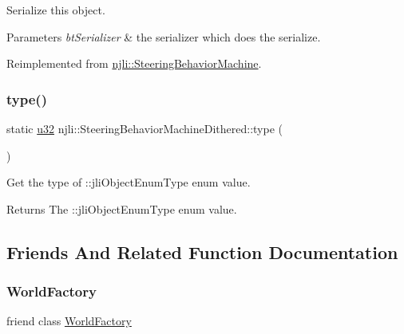 Serialize this object.


\begin{DoxyParams}{Parameters}
{\em bt\+Serializer} & the serializer which does the serialize. \\
\hline
\end{DoxyParams}


Reimplemented from \mbox{\hyperlink{classnjli_1_1_steering_behavior_machine_a1fbec43b76f0612ed5b0d2492bb4b6df}{njli\+::\+Steering\+Behavior\+Machine}}.

\mbox{\label{classnjli_1_1_steering_behavior_machine_dithered_a010e9f5b4f86832a6bcfedc724720582}} 
\subsubsection{\texorpdfstring{type()}{type()}}
{\footnotesize\ttfamily static \mbox{\hyperlink{_util_8h_a10e94b422ef0c20dcdec20d31a1f5049}{u32}} njli\+::\+Steering\+Behavior\+Machine\+Dithered\+::type (\begin{DoxyParamCaption}{ }\end{DoxyParamCaption})\hspace{0.3cm}{\ttfamily [static]}}

Get the type of \+::jli\+Object\+Enum\+Type enum value.

\begin{DoxyReturn}{Returns}
The \+::jli\+Object\+Enum\+Type enum value. 
\end{DoxyReturn}


\subsection{Friends And Related Function Documentation}
\mbox{\label{classnjli_1_1_steering_behavior_machine_dithered_acb96ebb09abe8f2a37a915a842babfac}} 
\subsubsection{\texorpdfstring{World\+Factory}{WorldFactory}}
{\footnotesize\ttfamily friend class \mbox{\hyperlink{classnjli_1_1_world_factory}{World\+Factory}}\hspace{0.3cm}{\ttfamily [friend]}}



